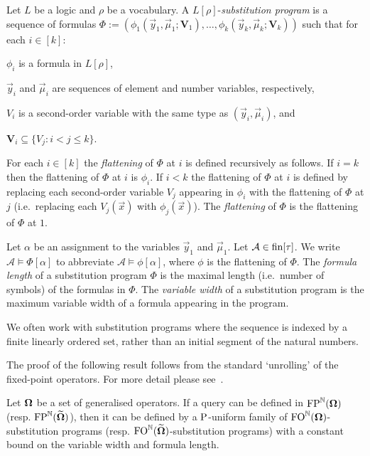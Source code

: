 \documentclass[../main/thesis.tex]{subfiles}
\begin{document}
\begin{definition}
  Let $L$ be a logic and $\rho$ be a vocabulary. A $L[\rho]$-\emph{substitution
    program} is a sequence of formulas $\Phi := (\phi_1(\vec{y}_1, \vec{\mu}_1;
  \boldsymbol{V}_1), \ldots, \phi_k(\vec{y}_k, \vec{\mu}_k;\boldsymbol{V}_k))$
  such that for each $i \in [k]$:
  \begin{myitemize}
  \item $\phi_i$ is a formula in $L[\rho]$,
  \item $\vec{y}_i$ and $\vec{\mu}_i$ are sequences of element and number
    variables, respectively,
  \item $V_i$ is a second-order variable with the same type as $(\vec{y}_i,
    \vec{\mu}_i)$, and
  \item $\boldsymbol{V}_i \subseteq \{V_j : i < j \leq k\}$.
  \end{myitemize}
  For each $i \in [k]$ the \emph{flattening} of $\Phi$ at $i$ is defined
  recursively as follows. If $i = k$ then the flattening of $\Phi$ at $i$ is
  $\phi_i$. If $i < k$ the flattening of $\Phi$ at $i$ is defined by replacing
  each second-order variable $V_j$ appearing in $\phi_i$ with the flattening of
  $\Phi$ at $j$ (i.e.\ replacing each $V_j(\vec{x})$ with $\phi_j(\vec{x})$).
  The \emph{flattening} of $\Phi$ is the flattening of $\Phi$ at $1$.

  Let $\alpha$ be an assignment to the variables $\vec{y}_1$ and $\vec{\mu}_1$.
  Let $\mathcal{A} \in \text{\upshape fin}{[\tau]}$. We write $\mathcal{A} \models \Phi[\alpha]$
  to abbreviate $\mathcal{A} \models \phi[\alpha]$, where $\phi$ is the
  flattening of $\Phi$. The \emph{formula length} of a substitution program
  $\Phi$ is the maximal length (i.e.\ number of symbols) of the formulas in
  $\Phi$. The \emph{variable width} of a substitution program is the maximum
  variable width of a formula appearing in the program.
\end{definition}

We often work with substitution programs where the sequence is indexed by a
finite linearly ordered set, rather than an initial segment of the natural
numbers.

The proof of the following result follows from the standard `unrolling' of the
fixed-point operators. For more detail please see~\cite{Kolaitis1992}.

\begin{lem}
  Let $\mathbf{\mathbf{\Omega}}$ be a set of generalised operators. If a query can be defined in
  $\text{\upshape FP}^{\mathbb{N}} (\mathbf{\mathbf{\Omega}})$ (resp. $\text{\upshape FP}^{\mathbb{N}} (\widetilde{\mathbf{\mathbf{\Omega}}})$), then it can be
  defined by a $\mathrm{P}$-uniform family of $\text{\upshape FO}^{\mathbb{N}} (\mathbf{\mathbf{\Omega}})$-substitution
  programs (resp. $\text{\upshape FO}^{\mathbb{N}} (\widetilde{\mathbf{\mathbf{\Omega}}})$-substitution programs) with a
  constant bound on the variable width and formula length.
  \label{lem:unroll-fixed-point}
\end{lem}
\end{document}

